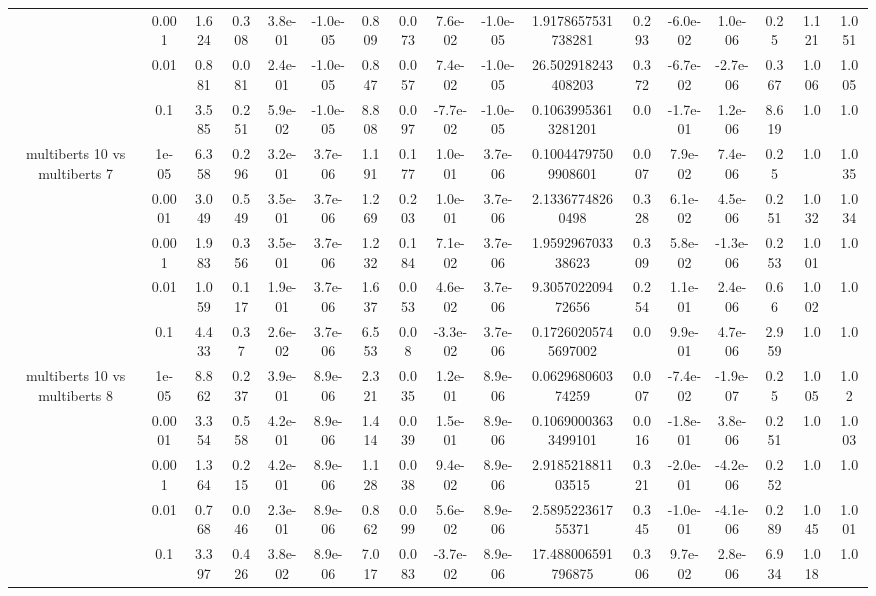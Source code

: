 \begin{tabular}{|c|c|c|c|c|c|c|c|c|c|c|c|c|c|c|c|c|}
 & 0.001 & 1.624 & 0.308 & 3.8e-01 & -1.0e-05 & 0.809 & 0.073 & 7.6e-02 & -1.0e-05 & 1.9178657531738281 & 0.293 & -6.0e-02 & 1.0e-06 & 0.25 & 1.121 & 1.051 \\
 & 0.01 & 0.881 & 0.081 & 2.4e-01 & -1.0e-05 & 0.847 & 0.057 & 7.4e-02 & -1.0e-05 & 26.502918243408203 & 0.372 & -6.7e-02 & -2.7e-06 & 0.367 & 1.006 & 1.005 \\
 & 0.1 & 3.585 & 0.251 & 5.9e-02 & -1.0e-05 & 8.808 & 0.097 & -7.7e-02 & -1.0e-05 & 0.10639953613281201 & 0.0 & -1.7e-01 & 1.2e-06 & 8.619 & 1.0 & 1.0 \\
\hline
\multirow{5}{*}{multiberts 10 vs multiberts 7} & 1e-05 & 6.358 & 0.296 & 3.2e-01 & 3.7e-06 & 1.191 & 0.177 & 1.0e-01 & 3.7e-06 & 0.10044797509908601 & 0.007 & 7.9e-02 & 7.4e-06 & 0.25 & 1.0 & 1.035 \\
 & 0.0001 & 3.049 & 0.549 & 3.5e-01 & 3.7e-06 & 1.269 & 0.203 & 1.0e-01 & 3.7e-06 & 2.13367748260498 & 0.328 & 6.1e-02 & 4.5e-06 & 0.251 & 1.032 & 1.034 \\
 & 0.001 & 1.983 & 0.356 & 3.5e-01 & 3.7e-06 & 1.232 & 0.184 & 7.1e-02 & 3.7e-06 & 1.959296703338623 & 0.309 & 5.8e-02 & -1.3e-06 & 0.253 & 1.001 & 1.0 \\
 & 0.01 & 1.059 & 0.117 & 1.9e-01 & 3.7e-06 & 1.637 & 0.053 & 4.6e-02 & 3.7e-06 & 9.305702209472656 & 0.254 & 1.1e-01 & 2.4e-06 & 0.66 & 1.002 & 1.0 \\
 & 0.1 & 4.433 & 0.37 & 2.6e-02 & 3.7e-06 & 6.553 & 0.08 & -3.3e-02 & 3.7e-06 & 0.17260205745697002 & 0.0 & 9.9e-01 & 4.7e-06 & 2.959 & 1.0 & 1.0 \\
\hline
\multirow{5}{*}{multiberts 10 vs multiberts 8} & 1e-05 & 8.862 & 0.237 & 3.9e-01 & 8.9e-06 & 2.321 & 0.035 & 1.2e-01 & 8.9e-06 & 0.062968060374259 & 0.007 & -7.4e-02 & -1.9e-07 & 0.25 & 1.005 & 1.02 \\
 & 0.0001 & 3.354 & 0.558 & 4.2e-01 & 8.9e-06 & 1.414 & 0.039 & 1.5e-01 & 8.9e-06 & 0.10690003633499101 & 0.016 & -1.8e-01 & 3.8e-06 & 0.251 & 1.0 & 1.003 \\
 & 0.001 & 1.364 & 0.215 & 4.2e-01 & 8.9e-06 & 1.128 & 0.038 & 9.4e-02 & 8.9e-06 & 2.918521881103515 & 0.321 & -2.0e-01 & -4.2e-06 & 0.252 & 1.0 & 1.0 \\
 & 0.01 & 0.768 & 0.046 & 2.3e-01 & 8.9e-06 & 0.862 & 0.099 & 5.6e-02 & 8.9e-06 & 2.589522361755371 & 0.345 & -1.0e-01 & -4.1e-06 & 0.289 & 1.045 & 1.001 \\
 & 0.1 & 3.397 & 0.426 & 3.8e-02 & 8.9e-06 & 7.017 & 0.083 & -3.7e-02 & 8.9e-06 & 17.488006591796875 & 0.306 & 9.7e-02 & 2.8e-06 & 6.934 & 1.018 & 1.0 \\

\end{tabular}
